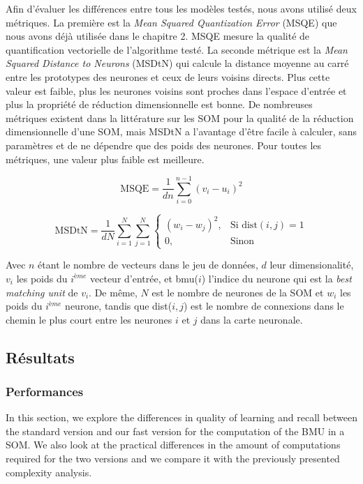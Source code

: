 	Afin d'évaluer les différences entre tous les modèles testés, nous avons utilisé deux métriques. La première est la \textit{Mean Squared Quantization Error} (MSQE) que nous avons déjà utilisée dans le chapitre 2. MSQE mesure la qualité de quantification vectorielle de l'algorithme testé. La seconde métrique est la \textit{Mean Squared Distance to Neurons} (MSDtN) qui calcule la distance moyenne au carré entre les prototypes des neurones et ceux de leurs voisins directs. Plus cette valeur est faible, plus les neurones voisins sont proches dans l'espace d'entrée et plus la propriété de réduction dimensionnelle est bonne. De nombreuses métriques existent dans la littérature sur les SOM pour la qualité de la réduction dimensionnelle d'une SOM, mais MSDtN a l'avantage d'être facile à calculer, sans paramètres et de ne dépendre que des poids des neurones. Pour toutes les métriques, une valeur plus faible est meilleure. 

	\begin{equation}
		\text{MSQE} = \frac{1}{dn} \sum_{i=0}^{n-1} (v_i - u_i)^2
	\end{equation}

	\begin{equation}
    	\text{MSDtN} = \frac{1}{dN} \sum_{i=1}^{N} \sum_{j=1}^{N} 
    	\begin{cases}
        	(w_i - w_j)^2,  & \text{Si dist}(i, j) = 1\\
        	0,              & \text{Sinon}
    	\end{cases}
	\end{equation}

	Avec $n$ étant le nombre de vecteurs dans le jeu de données, $d$ leur dimensionalité, $v_i$ les poids du $i^{ème}$ vecteur d'entrée, et bmu($i$) l'indice du neurone qui est la \textit{best matching unit} de $v_i$. De même, $N$ est le nombre de neurones de la SOM et $w_i$ les poids du $i^{ème}$ neurone, tandis que dist($i, j$) est le nombre de connexions dans le chemin le plus court entre les neurones $i$ et $j$ dans la carte neuronale.

	\subsection{Résultats}
	\subsubsection{Performances}

	In this section, we explore the differences in quality of learning and recall between the standard version and our fast version for the computation of the BMU in a SOM. We also look at the practical differences in the amount of computations required for the two versions and we compare it with the previously presented complexity analysis.
	
